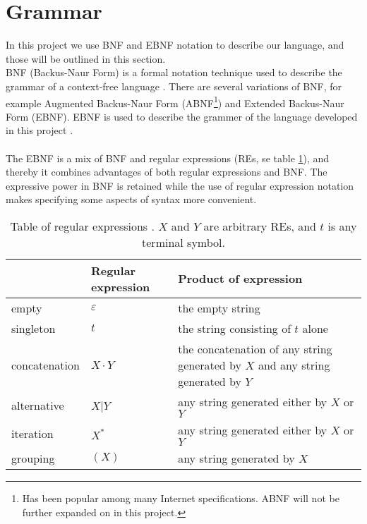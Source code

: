 \section{Grammar}
\label{sec:ebnf}

In this project we use BNF and EBNF notation to describe our language, and those will be outlined in this section.\\ \indent
BNF (Backus-Naur Form) is a formal notation technique used to describe the grammar of a context-free language \cite{misc:ss}. There are several variations of BNF, for example Augmented Backus-Naur Form (ABNF\footnote{Has been popular among many
   Internet specifications. ABNF will not be further expanded on in this project.}) and Extended Backus-Naur Form (EBNF). EBNF is used to describe the grammer of the language developed in this project \cite{misc:spo}.\\
\\
The EBNF is a mix of BNF and regular expressions (REs, se table \ref{tab:re}), and thereby it combines advantages of both regular expressions and BNF. The expressive power in BNF is retained while the use of regular expression notation makes specifying some aspects of syntax more convenient.

\begin{center}
	\begin{table}[H]
    \begin{tabular}{ | l | l | p{6.5cm} |}
    \hline
     & Regular expression & Product of expression\\ \hline
    empty & $\varepsilon$ & the empty string\\ \hline
    singleton & $t$ & the string consisting of $t$ alone\\ \hline
    concatenation & $X \cdot Y$ & the concatenation of any string generated	by $X$ and any string generated by $Y$\\ \hline
		alternative & $X$|$Y$ & any string generated either by $X$ or $Y$\\ \hline
		iteration & $X^*$ & any string generated either by $X$ or $Y$\\ \hline
		grouping & $(X)$ & any string generated by $X$\\ \hline
    \end{tabular}
		\caption{Table of regular expressions \cite{misc:spo}. $X$ and $Y$ are arbitrary REs, and $t$ is any terminal symbol.}
		\label{tab:re}
	\end{table}
\end{center}


